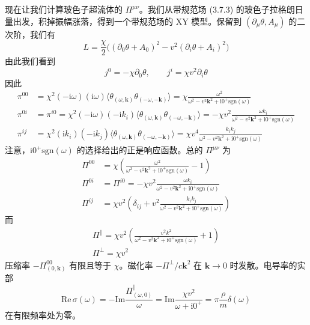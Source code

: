 现在让我们计算玻色子超流体的 $\Pi^{\mu\nu}$。我们从带规范场 (3.7.3) 的玻色子拉格朗日量出发，积掉振幅涨落，得到一个带规范场的 XY 模型。保留到 $(\partial_\mu\theta,A_\mu)$ 的二次阶，我们有
\begin{equation*}
L=\frac{\chi}{2}\big((\partial_0\theta+A_0)^2-v^2(\partial_i\theta+A_i)^2\big) \tag{3.7.10}
\end{equation*}
由此我们看到
\begin{equation*}
j^0=-\chi\partial_0\theta,\qquad j^i=\chi v^2\partial_i\theta
\end{equation*}
因此
\begin{align*}
\pi^{00}&=\chi^2(-\mathrm{i}\omega)(\mathrm{i}\omega)\big\langle\theta_{(\omega,\pmb{k})}\theta_{(-\omega,-\pmb{k})}\big\rangle=\chi\frac{\omega^2}{\omega^2-v^2\pmb{k}^2+\mathrm{i}0^+\mathrm{sgn}(\omega)}\\
\pi^{0i}&=\pi^{i0}=\chi^2(-\mathrm{i}\omega)(-\mathrm{i}k_i)\big\langle\theta_{(\omega,\pmb{k})}\theta_{(-\omega,-\pmb{k})}\big\rangle=-\chi v^2\frac{\omega k_i}{\omega^2-v^2\pmb{k}^2+\mathrm{i}0^+\mathrm{sgn}(\omega)}\\
\pi^{ij}&=\chi^2(\mathrm{i}k_i)(-\mathrm{i}k_j)\big\langle\theta_{(\omega,\pmb{k})}\theta_{(-\omega,-\pmb{k})}\big\rangle=\chi v^4\frac{k_ik_j}{\omega^2-v^2\pmb{k}^2+\mathrm{i}0^+\mathrm{sgn}(\omega)}
\end{align*}
注意，$\mathrm{i}0^+\mathrm{sgn}(\omega)$ 的选择给出的正是响应函数。总的 $\Pi^{\mu\nu}$ 为
\begin{align*}
\Pi^{00}&=\chi\left(\frac{\omega^2}{\omega^2-v^2\pmb{k}^2+\mathrm{i}0^+\mathrm{sgn}(\omega)}-1\right)\\
\Pi^{0i}&=\Pi^{i0}=-\chi v^2\frac{\omega k_i}{\omega^2-v^2\pmb{k}^2+\mathrm{i}0^+\mathrm{sgn}(\omega)}\\
\Pi^{ij}&=\chi v^2\left(\delta_{ij}+v^2\frac{k_ik_j}{\omega^2-v^2\pmb{k}^2+\mathrm{i}0^+\mathrm{sgn}(\omega)}\right)
\end{align*}
而
\begin{gather*}
\Pi^{\parallel}=\chi v^2\left(\frac{v^2k^2}{\omega^2-v^2\pmb{k}^2+\mathrm{i}0^+\mathrm{sgn}(\omega)}+1\right)\\
\Pi^{\perp}=\chi v^2
\end{gather*}
压缩率 $-\Pi^{00}_{(0,\pmb{k})}$ 有限且等于 $\chi$。磁化率 $-\Pi^{\perp}/c\pmb{k}^2$ 在 $\pmb{k}\to0$ 时发散。电导率的实部
\begin{equation*}
\mathrm{Re}\,\sigma(\omega)=-\mathrm{Im}\frac{\Pi^{\parallel}_{(\omega,0)}}{\omega}=\mathrm{Im}\frac{\chi v^2}{\omega+\mathrm{i}0^+}=\pi\frac{\rho}{m}\delta(\omega)
\end{equation*}
在有限频率处为零。

